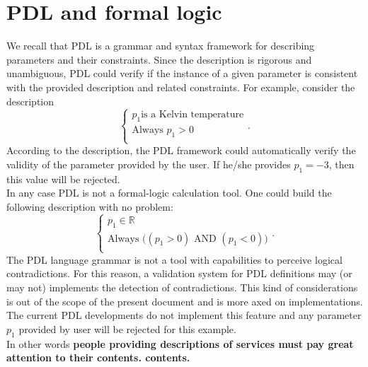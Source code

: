 \documentclass[a4paper,11pt] {ivoa}
\begin{document}
\section{PDL and formal logic}
We recall that PDL is a grammar and syntax framework for describing parameters and their
constraints. Since the description is rigorous and unambiguous, PDL could verify if the instance of
a given parameter is consistent with the provided description and related constraints. For example,
consider the description
\begin{equation}
\left\{
\begin{array}{l}
p_1 \mbox{is a Kelvin temperature}\\
\mbox{Always }  p_1 > 0 \\
\end{array}
\right..
\end{equation}
According to the description, the PDL framework could automatically verify the validity of the
parameter provided by the user.
If he/she provides $p_1=-3$, then this value will be rejected.\\
In any case PDL is not a formal-logic calculation tool. One could build the following description
with no problem:
\begin{equation}
\left\{
\begin{array}{l}
p_1 \in \mathbb R\\
\displaystyle \mbox{Always } \big(  (p_1 > 0) \mbox{ AND } (p_1 < 0) \big)\\
\end{array}
\right..
\end{equation}
The PDL language grammar is not a tool with capabilities to perceive logical contradictions. 
For this reason, a validation system for PDL definitions may (or may not) implements the  detection of contradictions. This kind of considerations is out of the scope of the present document and is more axed on implementations. The current PDL developments do not implement this feature and any parameter $p_1$ provided by user will be rejected for this example.\\
In other words {\bf people providing descriptions of services must pay great attention to their contents.
contents.}\\
\end{document}
